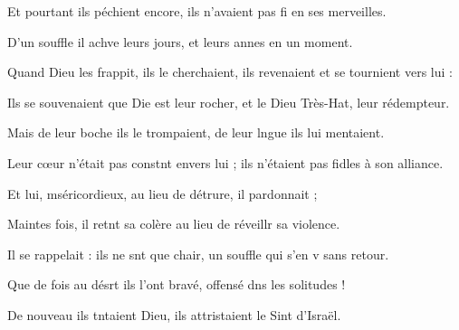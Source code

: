 \item Et pourtant ils péchient encore,\psstar{} ils n’avaient pas fi en ses merveilles.
\item D’un souffle il achve leurs jours,\psstar{} et leurs annes en un moment.
\item Quand Dieu les frappit, ils le cherchaient,\psstar{} ils revenaient et se tournient vers lui :
\item Ils se souvenaient que Die est leur rocher,\psstar{} et le Dieu Très-Hat, leur rédempteur.
\item Mais de leur boche ils le trompaient,\psstar{} de leur lngue ils lui mentaient.
\item Leur cœur n’était pas constnt envers lui ;\psstar{} ils n’étaient pas fidles à son alliance.
\item Et lui, mséricordieux,\psstar{} au lieu de détrure, il pardonnait ; 
\item Maintes fois, il retnt sa colère\psstar{} au lieu de réveillr sa violence.
\item Il se rappelait : ils ne snt que chair,\psstar{} un souffle qui s’en v sans retour.
\item Que de fois au désrt ils l’ont bravé,\psstar{} offensé dns les solitudes !
\item De nouveau ils tntaient Dieu,\psstar{} ils attristaient le Sint d’Israël.